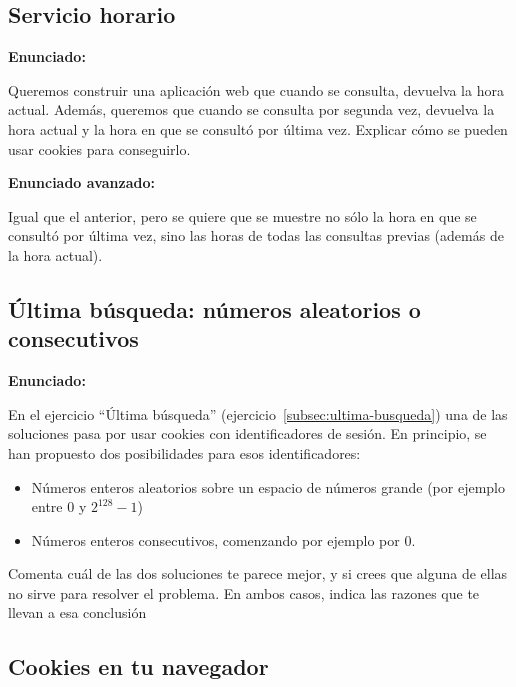 \subsection{Servicio horario}
\label{subsec:ej-servicio-horario}

\textbf{Enunciado:}

Queremos construir una aplicación web que cuando se consulta, devuelva la hora actual. Además, queremos que cuando se consulta por segunda vez, devuelva la hora actual y la hora en que se consultó por última vez. Explicar cómo se pueden usar cookies para conseguirlo.

\textbf{Enunciado avanzado:}

Igual que el anterior, pero se quiere que se muestre no sólo la hora en que se consultó por última vez, sino las horas de todas las consultas previas (además de la hora actual).

\subsection{Última búsqueda: números aleatorios o consecutivos}
\label{subsec:ultima-busqueda-aleconsec}

\textbf{Enunciado:}

En el ejercicio ``Última búsqueda'' (ejercicio~\ref{subsec:ultima-busqueda}) una de las soluciones pasa por usar cookies con identificadores de sesión. En principio, se han propuesto dos posibilidades para esos identificadores:

\begin{itemize}
\item Números enteros aleatorios sobre un espacio de números grande (por ejemplo entre 0 y $2^{128}-1$)
\item Números enteros consecutivos, comenzando por ejemplo por 0.
\end{itemize}

Comenta cuál de las dos soluciones te parece mejor, y si crees que alguna de ellas no sirve para resolver el problema. En ambos casos, indica las razones que te llevan a esa conclusión


\subsection{Cookies en tu navegador}
\label{subsec:cookies-navegador}


